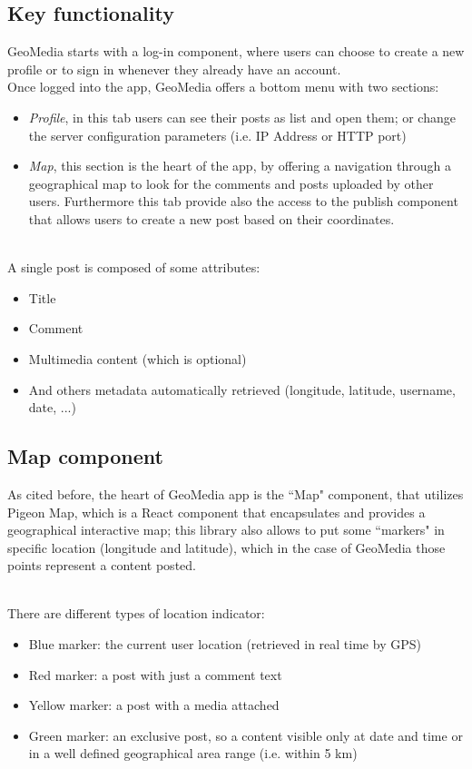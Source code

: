\documentclass[conference]{IEEEtran}
\begin{document}
\subsection{Key functionality }

GeoMedia starts with a log-in component, where users can choose to create a new profile or to sign in whenever they already have an account.
\\
Once logged into the app, GeoMedia offers a bottom menu with two sections: 
\begin{itemize}
    \item \textit{Profile}, in this tab users can see their posts as list and open them; or change the server configuration parameters (i.e. IP Address or HTTP port)
    \item  \textit{Map}, this section is the heart of the app, by offering a navigation through a geographical map to look for the comments and posts uploaded by other users. Furthermore this tab provide also the access to the publish component that allows users to create a new post based on their coordinates.
\end{itemize}

\\
A single post is composed of some attributes:
\begin{itemize}
    \item Title
    \item Comment
    \item Multimedia content (which is optional)
    \item And others metadata automatically retrieved (longitude, latitude, username, date, ...)
\end{itemize}

\subsection{Map component}

As cited before, the heart of GeoMedia app is the ``Map" component, that utilizes Pigeon Map\cite{b8}, which is a React component that encapsulates and provides a geographical interactive map; this library also allows to put some ``markers" in specific location (longitude and latitude), which in the case of GeoMedia those points represent a content posted.

\\

There are different types of location indicator:
\begin{itemize}
\item Blue marker: the current user location (retrieved in real time by GPS)
\item Red marker: a post with just a comment text
\item Yellow marker: a post with a media attached
\item Green marker: an exclusive post, so a content visible only at date and time or in a well defined geographical area range (i.e. within 5 km)
\end{itemize}
\end{document}
